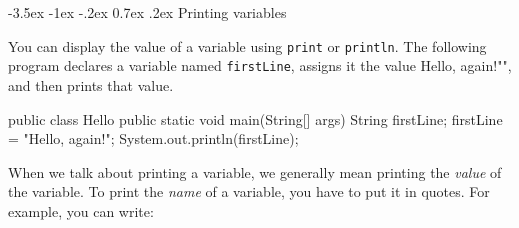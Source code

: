 \documentclass[12pt]{book}
\makeatletter
\theoremstyle{exercise}
\newcommand{\java}[1]{\verb"#1"}
\renewcommand{\section}{\@startsection{section}{1}{\z@}%
    {-3.5ex \@plus -1ex \@minus -.2ex}%
    {0.7ex \@plus.2ex}%
    {\normalfont\Large\bfseries}}
\renewcommand\subsection{\@startsection{subsection}{2}{\z@}%
    {-3.25ex\@plus -1ex \@minus -.2ex}%
    {0.3ex \@plus .2ex}%
    {\normalfont\large\bfseries}}
\newcommand{\java}[1]{\lstinline{#1}} %
\makeatother
\begin{document}
%
%
%
%
%
%


\section{Printing variables}
\label{sec:printvar}

You can display the value of a variable using \java{print} or \java{println}.
The following program declares a variable named \java{firstLine}, assigns it the value \java{"Hello, again!"}, and then prints that value.

\begin{code}
public class Hello {
    public static void main(String[] args) {
        String firstLine;
        firstLine = "Hello, again!";
        System.out.println(firstLine);
    }
}
\end{code}

When we talk about printing a variable, we generally mean printing the {\em value} of the variable.
To print the {\em name} of a variable, you have to put it in quotes.
For example, you can write:
\end{document}
